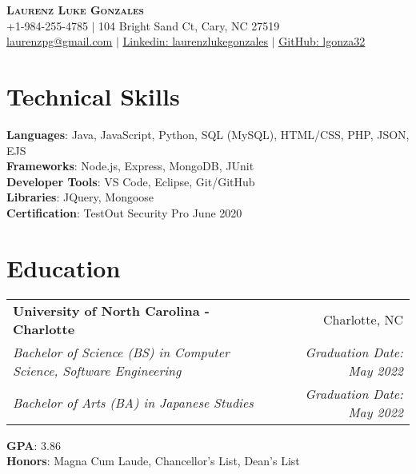\documentclass[letterpaper,10pt]{article}
\makeatletter
\newcommand{\resumeEdu}[6]{
  \vspace{-2pt}\item
    \begin{tabular*}{0.97\textwidth}[t]{l@{\extracolsep{\fill}}r}
      \textbf{#1} & #2 \\
      \textit{\small#3} & \textit{\small #4} \\
      \textit{\small#5} & \textit{\small #6} \\
    \end{tabular*}\vspace{-7pt}
}
\newcommand{\resumeSubHeadingListStart}{\begin{itemize}[leftmargin=0.15in, label={}]}
\newcommand{\resumeSubHeadingListEnd}{\end{itemize}}
\makeatother
\begin{document}

\begin{center}
    \textbf{\Huge \scshape Laurenz Luke Gonzales} \\ \vspace{1pt}
    \small +1-984-255-4785 $|$ 104 Bright Sand Ct, Cary, NC 27519 \\
    \href{mailto:laurenzpg@gmail.com}{\underline{laurenzpg@gmail.com}} $|$ 
    \href{https://linkedin.com/in/laurenzlukegonzales}{\underline{Linkedin: laurenzlukegonzales}} $|$
    \href{https://github.com/lgonza32}{\underline{GitHub: lgonza32}} 
\end{center}

\section{Technical Skills}
 \begin{itemize}[leftmargin=0.15in, label={}]
    \small{\item{
     \textbf{Languages}{: Java, JavaScript, Python, SQL (MySQL), HTML/CSS, PHP, JSON, EJS} \\
     \textbf{Frameworks}{: Node.js, Express, MongoDB, JUnit} \\
     \textbf{Developer Tools}{: VS Code, Eclipse, Git/GitHub} \\
     \textbf{Libraries}{: JQuery, Mongoose} \\
     \textbf{Certification}{: TestOut Security Pro \hfill{June 2020}} \\
    }}
 \end{itemize}

\section{Education}
  \resumeSubHeadingListStart
    \resumeEdu
      {University of North Carolina - Charlotte}{Charlotte, NC}
      {Bachelor of Science (BS) in Computer Science, Software Engineering}{Graduation Date: May 2022}
      {Bachelor of Arts (BA) in Japanese Studies}{Graduation Date: May 2022}
    \small{\item{
      \textbf{GPA}{: 3.86} \\
      \textbf{Honors}{: Magna Cum Laude, Chancellor's List, Dean's List} \\
      }}
  \resumeSubHeadingListEnd
\end{document}

